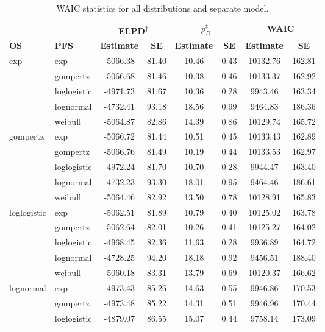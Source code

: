 \documentclass[AMA,STIX1COL]{WileyNJD-v2}
\begin{document}
\begin{table}[H]
\caption{WAIC statistics for all distributions and separate model. \label{tab:waic_separate}}
\centering
\begin{tabular}{l l c c c c c c}
\toprule
\multicolumn{1}{l}{} & \multicolumn{1}{l}{} & \multicolumn{2}{c}{\textbf{ELPD\textsuperscript{$\dagger$}}} & \multicolumn{2}{c}{\textbf{$p_D^{\ddagger}$}} & \multicolumn{2}{c}{\textbf{WAIC}} \\
\cmidrule{3-4}\cmidrule{5-6}\cmidrule{7-8}
\textbf{OS} & \textbf{PFS} & \textbf{Estimate} & \textbf{SE} & \textbf{Estimate} & \textbf{SE} & \textbf{Estimate} & \textbf{SE}\\
\midrule
exp & exp & -5066.38 & 81.40 & 10.46 & 0.43 & 10132.76 & 162.81\\
 & gompertz & -5066.68 & 81.46 & 10.38 & 0.46 & 10133.37 & 162.92\\
 & loglogistic & -4971.73 & 81.67 & 10.36 & 0.28 & 9943.46 & 163.34\\
 & lognormal & -4732.41 & 93.18 & 18.56 & 0.99 & 9464.83 & 186.36\\
 & weibull & -5064.87 & 82.86 & 14.39 & 0.86 & 10129.74 & 165.72\\
gompertz & exp & -5066.72 & 81.44 & 10.51 & 0.45 & 10133.43 & 162.89\\
 & gompertz & -5066.76 & 81.49 & 10.19 & 0.44 & 10133.53 & 162.97\\
 & loglogistic & -4972.24 & 81.70 & 10.70 & 0.28 & 9944.47 & 163.40\\
 & lognormal & -4732.23 & 93.30 & 18.01 & 0.95 & 9464.46 & 186.61\\
 & weibull & -5064.46 & 82.92 & 13.50 & 0.78 & 10128.91 & 165.83\\
loglogistic & exp & -5062.51 & 81.89 & 10.79 & 0.40 & 10125.02 & 163.78\\
 & gompertz & -5062.64 & 82.01 & 10.26 & 0.41 & 10125.27 & 164.02\\
 & loglogistic & -4968.45 & 82.36 & 11.63 & 0.28 & 9936.89 & 164.72\\
 & lognormal & -4728.25 & 94.20 & 18.18 & 0.92 & 9456.51 & 188.40\\
 & weibull & -5060.18 & 83.31 & 13.79 & 0.69 & 10120.37 & 166.62\\
lognormal & exp & -4973.43 & 85.26 & 14.63 & 0.55 & 9946.86 & 170.53\\
 & gompertz & -4973.48 & 85.22 & 14.31 & 0.51 & 9946.96 & 170.44\\
 & loglogistic & -4879.07 & 86.55 & 15.07 & 0.44 & 9758.14 & 173.09\\

\end{tabular}
\end{table}
\end{document}
